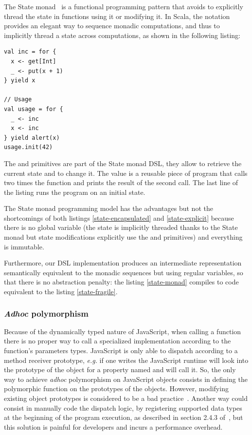 \documentclass[american,english,runningheads]{llncs}
\newcommand{\eg}{\emph{e.g.}}
\begin{document}
The State monad~\cite{Wadler92_StateM} is a functional programming pattern that avoids to explicitly thread the state in functions using it or modifying it. In Scala, the  notation provides an elegant way to sequence monadic computations, and thus to implicitly thread a state across computations, as shown in the following listing:

\begin{lstlisting}[label=state-monad,caption=Implicitly threaded state using the State Monad]
val inc = for {
  x <- get[Int]
  _ <- put(x + 1)
} yield x

// Usage
val usage = for {
  _ <- inc
  x <- inc
} yield alert(x)
usage.init(42)
\end{lstlisting}

The  and  primitives are part of the State monad DSL, they allow to retrieve the current state and to change it. The  value is a reusable piece of program that calls two times the  function and prints the result of the second call. The last line of the listing runs the  program on an initial state.

The State monad programming model has the advantages but not the shortcomings of both listings \ref{state-encapsulated} and \ref{state-explicit} because there is no global variable (the state is implicitly threaded thanks to the State monad but state modifications explicitly use the  and  primitives) and everything is immutable.

Furthermore, our DSL implementation produces an intermediate representation semantically equivalent to the monadic sequences but using regular variables, so that there is no abstraction penalty: the listing \ref{state-monad} compiles to code equivalent to the listing \ref{state-fragile}.

\subsubsection{\emph{Adhoc} polymorphism}

Because of the dynamically typed nature of JavaScript, when calling a function there is no proper way to call a specialized implementation according to the function’s parameters types. JavaScript is only able to dispatch according to a method receiver prototype, \eg{} if one writes  the JavaScript runtime will look into the prototype of the  object for a property named  and will call it. So, the only way to achieve \emph{adhoc} polymorphism on JavaScript objects consists in defining the polymorphic function on the prototypes of the objects. However, modifying existing object prototypes is considered to be a bad practice~\cite{Zakas12_MaintainableJs}. Another way could consist in manually code the dispatch logic, by registering supported data types at the beginning of the program execution, as described in section 2.4.3 of~\cite{Abelson83_SICP}, but this solution is painful for developers and incurs a performance overhead.
\end{document}
